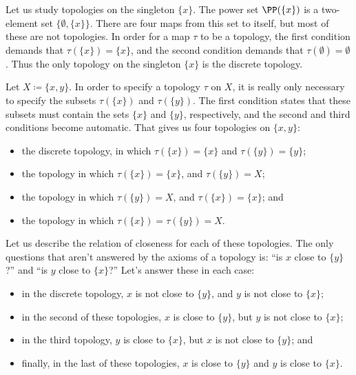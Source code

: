 \begin{exm}
	Let us study topologies on the singleton $ \{ x \} $.
	The power set $ \PP( \{ x \} ) $ is a two-element set $ \{ \emptyset, \{ x \} \} $.
	There are four maps from this set to itself, but most of these are not topologies.
	In order for a map $ \tau $ to be a topology, the first condition demands that $ \tau( \{ x \} ) = \{ x \} $, and the second condition demands that $ \tau ( \emptyset ) = \emptyset $.
	Thus the only topology on the singleton $ \{ x \} $ is the discrete topology.
\end{exm}

\begin{exm}%
	\label{topologiesontwopointset}
	Let $ X \coloneq \{ x , y \} $.
	In order to specify a topology $ \tau $ on $ X $, it is really only necessary to specify the subsets $ \tau ( \{ x \} ) $ and $ \tau ( \{ y \} ) $.
	The first condition states that these subsets must contain the sets $ \{ x \} $ and $ \{ y \} $, respectively, and the second and third conditions become automatic.
	That gives us four topologies on $ \{ x, y \} $:
	\begin{itemize}
		\item the discrete topology, in which $ \tau( \{ x \} ) = \{ x \} $ and $ \tau( \{ y \} ) = \{ y \} $;
		\item the topology in which $ \tau( \{ x \} ) = \{ x \}$, and $ \tau( \{ y \} ) = X $; 
		\item the topology in which $ \tau( \{ y \} ) = X $, and $ \tau( \{ x \} ) = \{ x \} $; and
		\item the topology in which $ \tau( \{ x \} ) = \tau( \{ y \} ) = X $.
	\end{itemize}

	Let us describe the relation of closeness for each of these topologies.
	The only questions that aren't answered by the axioms of a topology is: \enquote{is $ x $ close to $ \{ y \} $?} and \enquote{is $ y $ close to $ \{ x \} $?}
	Let's answer these in each case:
	\begin{itemize}
		\item in the discrete topology, $ x $ is not close to $ \{ y \} $, and $ y $ is not close to $ \{ x \} $;
		\item in the second of these topologies, $ x $ is close to $ \{ y \} $, but $ y $ is not close to $ \{ x \} $;
		\item in the third topology, $ y $ is close to $ \{ x \} $, but $ x $ is not close to $ \{ y \} $; and
		\item finally, in the last of these topologies, $ x $ is close to $ \{ y \} $ and $ y $ is close to $ \{ x \} $.
\end{itemize}


\end{exm}
